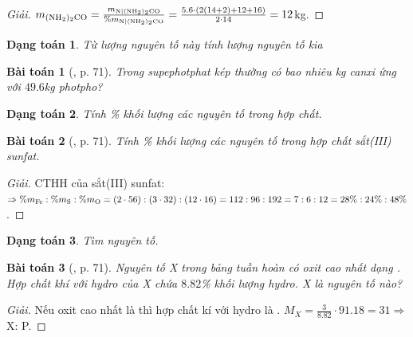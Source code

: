 \documentclass{article}
\newtheorem{baitoan}{Bài toán}
\newtheorem{dangtoan}{Dạng toán}
\begin{document}
\begin{proof}[Giải]
	$m_{\ce{(NH2)2CO}} = \frac{m_{\ce{N|(NH2)2CO}}}{\%m_{\ce{N|(NH2)2CO}}} = \frac{5.6\cdot(2(14 + 2) + 12 + 16)}{2\cdot14} = 12$kg.
\end{proof}

\begin{dangtoan}
	Từ lượng nguyên tố này tính lượng nguyên tố kia
\end{dangtoan}

\begin{baitoan}[\cite{Tuan2022}, p. 71]
	Trong supephotphat kép thường có bao nhiêu kg canxi ứng với $49.6$\emph{kg} photpho?
\end{baitoan}

\begin{dangtoan}
	Tính \% khối lượng các nguyên tố trong hợp chất.
\end{dangtoan}

\begin{baitoan}[\cite{Tuan2022}, p. 71]
	Tính \% khối lượng các nguyên tố trong hợp chất sắt(III) sunfat.
\end{baitoan}

\begin{proof}[Giải]
	CTHH của sắt(III) sunfat: $\Rightarrow\%m_{\ce{Fe}}:\%m_{\ce{S}}:\%m_{\ce{O}} = (2\cdot56):(3\cdot32):(12\cdot16) = 112:96:192 = 7:6:12 = 28\%:24\%:48\%$.
\end{proof}

\begin{dangtoan}
	Tìm nguyên tố.
\end{dangtoan}

\begin{baitoan}[\cite{Tuan2022}, p. 71]
	Nguyên tố X trong bảng tuần hoàn có oxit cao nhất dạng \emph{}. Hợp chất khí với hydro của X chứa $8.82$\% khối lượng hydro. X là nguyên tố nào?
\end{baitoan}

\begin{proof}[Giải]
	Nếu oxit cao nhất là  thì hợp chất kí với hydro là . $M_X = \frac{3}{8.82}\cdot91.18 = 31\Rightarrow$ X: P.
\end{proof}


\printbibliography[heading=bibintoc]
\end{document}
